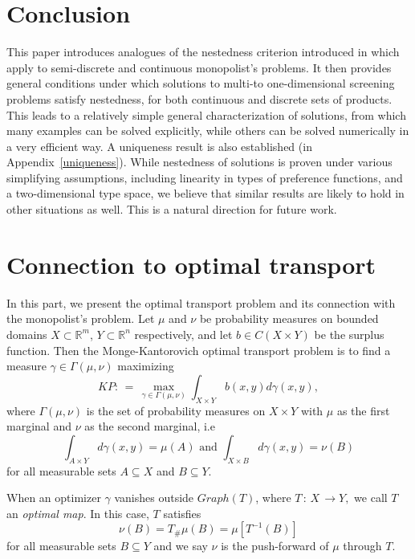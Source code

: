 \documentclass[12pt,reqno]{amsart}
\begin{document}
\section{Conclusion}
This paper introduces  analogues of the nestedness criterion introduced in \cite{ChiapporiMcCannPass17} which apply to semi-discrete and continuous monopolist's problems.  It then provides general conditions under which solutions to multi-to one-dimensional screening problems satisfy nestedness, for both continuous and discrete sets of products.  This leads to a relatively simple general characterization of solutions, from which many examples can be solved explicitly, while others can be  solved numerically in a very efficient way.  A uniqueness result is also established (in Appendix~\ref{uniqueness}).  While nestedness of solutions is proven under various simplifying assumptions, including linearity in types of preference functions, and a two-dimensional type space, we believe that similar results are likely to hold in other situations as well. This is a natural direction for future work.


\appendix
\section{Connection to optimal transport}\label{connection to ot}


In this part, we present the optimal transport problem and its connection with the monopolist's problem. Let $\mu$ and $\nu$ be probability measures on bounded domains $X \subset \mathbb{R}^m$,  $Y\subset \mathbb{R}^n$  respectively, and let $b\in C(X\times Y)$ be the surplus function. Then the Monge-Kantorovich optimal transport problem is %
to find a measure $\gamma\in \Gamma(\mu,\nu)$ maximizing
\begin{equation}\label{eqn: OT primal}\tag{KP}KP:\,=\,\max_{\gamma\in\Gamma(\mu,\nu)}\int_{X\times Y} b(x,y)d\gamma(x,y),
\end{equation}
where $\Gamma(\mu,\nu)$ is the set of probability measures on $X\times Y$ with $\mu$ as the first marginal and $\nu$ as the second marginal, i.e 
\[\int_{A\times Y}d\gamma(x,y)=\mu(A) \text{ and }\int_{X\times B}d\gamma(x,y)=\nu(B)\]
for all measurable sets $A\subseteq X$ and  $B\subseteq Y.$ 

When an optimizer $\gamma$ vanishes outside $Graph(T)$, where $T\,:\,X\,\to Y,$ we call $T$ an \emph{optimal map}. In this case, $T$ satisfies
\[\nu(B)=T_{\#}\mu(B)=\mu[T^{-1}(B)]\] for all measurable sets $B\subseteq Y$  and we say $\nu$ is the push-forward of $\mu$ through $T.$
\end{document}
